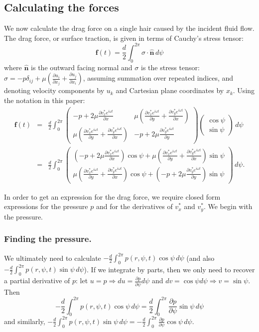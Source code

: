 \documentclass[11pt]{amsart}
\newcommand{\om}{\omega}
\newcommand{\ff}{\mathbf{f}}
\newcommand{\bn}{\mathbf{n}}
\newcommand{\bee}[1]{\begin{equation} #1 \end{equation}}
\newcommand{\bees}[1]{\begin{equation*} #1 \end{equation*}}
\newcommand{\baas}[1]{\begin{eqnarray*} #1 \end{eqnarray*}}
\newcommand{\pd}[2]{\ensuremath{\frac{\partial #1}{\partial #2}}}
\begin{document}
\subsection{Calculating the forces}
	We now calculate the drag force on a single hair caused by the incident fluid flow. The drag force, or surface traction, is given in terms of Cauchy's stress tensor: 
	\bee{
	\ff(t) = \frac{d}{2}\int_0^{2\pi} \sigma \cdot \hat{\bn} \,d\psi
	}
	where $\hat{\bn}$ is the outward facing normal and $\sigma$ is the stress tensor: $\sigma = -p\delta_{ij} + \mu \left( \pd{u_i}{x_j} + \pd{u_j}{x_i} \right)$, assuming summation over repeated indices, and denoting velocity components by $u_k$ and Cartesian plane coordinates by $x_k$. Using the notation in this paper:
	\baas{
	\ff(t) &=& \frac{d}{2}\int_0^{2\pi} \begin{pmatrix} -p + 2\mu \pd{v_x^* e^{i \om t}}{x} & \mu\left( \pd{v_x^* e^{i \om t}}{y} + \pd{v_y^* e^{i \om t}}{x}\right) \\ \mu\left( \pd{v_x^* e^{i \om t}}{y} + \pd{v_y^* e^{i \om t}}{x}\right) & -p + 2\mu \pd{v_y^* e^{i \om t}}{y} \end{pmatrix} \begin{pmatrix} \cos\psi \\ \sin\psi \end{pmatrix} \,d\psi \\
	&=& \frac{d}{2}\int_0^{2\pi} \begin{pmatrix} (-p + 2\mu \pd{v_x^* e^{i \om t}}{x})\cos\psi + \mu\left( \pd{v_x^* e^{i \om t}}{y} + \pd{v_y^* e^{i \om t}}{x}\right)\sin\psi \\ \mu\left( \pd{v_x^* e^{i \om t}}{y} + \pd{v_y^* e^{i \om t}}{x}\right)\cos\psi + (-p + 2\mu \pd{v_y^* e^{i \om t}}{y})\sin\psi \end{pmatrix} \,d\psi.
	} 
	
	In order to get an expression for the drag force, we require closed form expressions for the pressure $p$ and for the derivatives of $v_x^*$ and $v_y^*$. We begin with the pressure.
	
	\subsubsection{Finding the pressure.}
		
		We ultimately need to calculate $-\frac{d}{2}\int_0^{2\pi} p(r,\psi,t) \cos\psi \,d\psi$ (and also $-\frac{d}{2}\int_0^{2\pi} p(r,\psi,t) \sin\psi \,d\psi$). If we integrate by parts, then we only need to recover a partial derivative of $p$: let $u=p \Rightarrow du = \pd{p}{\psi}d\psi$ and $dv = \cos\psi d\psi \Rightarrow v = \sin\psi$. Then 
		\bees{
		-\frac{d}{2}\int_0^{2\pi} p(r,\psi,t) \cos\psi \,d\psi = \frac{d}{2}\int_0^{2\pi} \pd{p}{\psi} \sin\psi \, d\psi
		}
		and similarly, $-\frac{d}{2}\int_0^{2\pi} p(r,\psi,t) \sin\psi \,d\psi = -\frac{d}{2}\int_0^{2\pi} \pd{p}{\psi} \cos\psi \, d\psi$.
		
\end{document}
